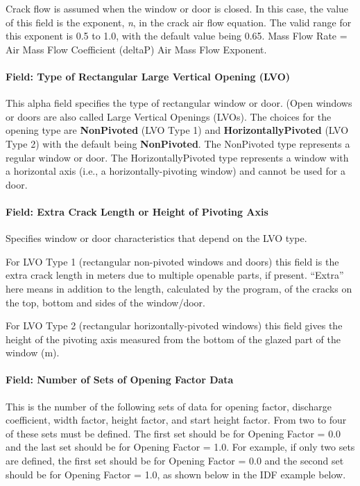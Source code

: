 Crack flow is assumed when the window or door is closed. In this case, the value of this field is the exponent, \emph{n}, in the crack air flow equation. The valid range for this exponent is 0.5 to 1.0, with the default value being 0.65. Mass Flow Rate = Air Mass Flow Coefficient (deltaP) Air Mass Flow Exponent.

\paragraph{Field: Type of Rectangular Large Vertical Opening (LVO)}\label{field-type-of-rectangular-large-vertical-opening-lvo}

This alpha field specifies the type of rectangular window or door. (Open windows or doors are also called Large Vertical Openings (LVOs). The choices for the opening type are \textbf{NonPivoted} (LVO Type 1) and \textbf{HorizontallyPivoted} (LVO Type 2) with the default being \textbf{NonPivoted}. The NonPivoted type represents a regular window or door. The HorizontallyPivoted type represents a window with a horizontal axis (i.e., a horizontally-pivoting window) and cannot be used for a door.

\paragraph{Field: Extra Crack Length or Height of Pivoting Axis}\label{field-extra-crack-length-or-height-of-pivoting-axis}

Specifies window or door characteristics that depend on the LVO type.

For LVO Type 1 (rectangular non-pivoted windows and doors) this field is the extra crack length in meters due to multiple openable parts, if present. ``Extra'' here means in addition to the length, calculated by the program, of the cracks on the top, bottom and sides of the window/door.

For LVO Type 2 (rectangular horizontally-pivoted windows) this field gives the height of the pivoting axis measured from the bottom of the glazed part of the window (m).

\paragraph{Field: Number of Sets of Opening Factor Data}\label{field-number-of-sets-of-opening-factor-data}

This is the number of the following sets of data for opening factor, discharge coefficient, width factor, height factor, and start height factor. From two to four of these sets must be defined. The first set should be for Opening Factor = 0.0 and the last set should be for Opening Factor = 1.0. For example, if only two sets are defined, the first set should be for Opening Factor = 0.0 and the second set should be for Opening Factor = 1.0, as shown below in the IDF example below.

